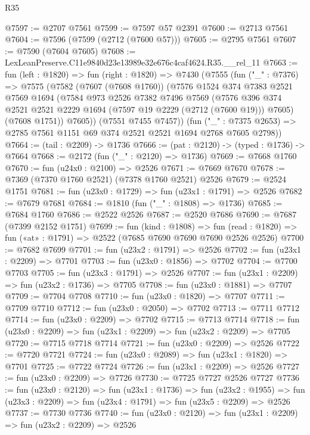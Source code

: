 \begin{lexlean}{R35}
\begin{coremodule}
@7597 := @2707 @7561
@7599 := @7597 @57 @2391
@7600 := @2713 @7561
@7604 := @7596 (@7599 (@2712 (@7600 @57)))
@7605 := @2795 @7561
@7607 := @7590 (@7604 @7605)
@7608 := LexLeanPreserve.C11e9840d23e13989e32e676c4caf4624.R35.__rel_11
@7663 := fun (left : @1820) =>
  fun (right : @1820) =>
  @7430
    (@7555
      (fun ("_" : @7376) =>
      @7575
        (@7582
          (@7607 (@7608 @1760))
          (@7576
            @1524
            @374
            @7383
            @2521
            @7569
            @1694
            (@7584
              @973
              @2526
              @7382
              @7496
              @7569
              (@7576 @396 @374 @2521 @2521 @2229 @1694 (@7597 @19 @2229 (@2712 (@7600 @19))) @7605)
              (@7608 @1751))
            @7605))
        (@7551 @7455 @7457))
      (fun ("_" : @7375 @2653) => @2785 @7561 @1151 @69 @374 @2521 @2521 @1694 @2768 @7605 @2798))
@7664 := (tail : @2209) -> @1736
@7666 := (pat : @2120) -> (typed : @1736) -> @7664
@7668 := @2172 (fun ("_" : @2120) => @1736)
@7669 := @7668 @1760
@7670 := fun (u24x0 : @2100) => @2526
@7671 := @7669 @7670
@7678 := @7369 (@7370 @1760 @2521) (@7378 @1760 @2521) @2526
@7679 := @2524 @1751
@7681 := fun (u23x0 : @1729) => fun (u23x1 : @1791) => @2526
@7682 := @7679 @7681
@7684 := @1810 (fun ("_" : @1808) => @1736)
@7685 := @7684 @1760
@7686 := @2522 @2526
@7687 := @2520 @7686
@7690 := @7687 (@7399 @2152 @1751)
@7699 := fun (kind : @1808) =>
  fun (read : @1820) => fun («at» : @1791) => @2522 (@7685 @7690 @7690 @7690 @2526 @2526)
@7700 := @7682 @7699
@7701 := fun (u23x2 : @1791) => @2526
@7702 := fun (u23x1 : @2209) => @7701
@7703 := fun (u23x0 : @1856) => @7702
@7704 := @7700 @7703
@7705 := fun (u23x3 : @1791) => @2526
@7707 := fun (u23x1 : @2209) => fun (u23x2 : @1736) => @7705
@7708 := fun (u23x0 : @1881) => @7707
@7709 := @7704 @7708
@7710 := fun (u23x0 : @1820) => @7707
@7711 := @7709 @7710
@7712 := fun (u23x0 : @2050) => @7702
@7713 := @7711 @7712
@7714 := fun (u23x0 : @2209) => @7702
@7715 := @7713 @7714
@7718 := fun (u23x0 : @2209) => fun (u23x1 : @2209) => fun (u23x2 : @2209) => @7705
@7720 := @7715 @7718 @7714
@7721 := fun (u23x0 : @2209) => @2526
@7722 := @7720 @7721
@7724 := fun (u23x0 : @2089) => fun (u23x1 : @1820) => @7701
@7725 := @7722 @7724
@7726 := fun (u23x1 : @2209) => @2526
@7727 := fun (u23x0 : @2209) => @7726
@7730 := @7725 @7727 @2526 @7727
@7736 := fun (u23x0 : @2120) =>
  fun (u23x1 : @1736) =>
  fun (u23x2 : @1955) => fun (u23x3 : @2209) => fun (u23x4 : @1791) => fun (u23x5 : @2209) => @2526
@7737 := @7730 @7736
@7740 := fun (u23x0 : @2120) => fun (u23x1 : @2209) => fun (u23x2 : @2209) => @2526

\end{coremodule}
\end{lexlean}
